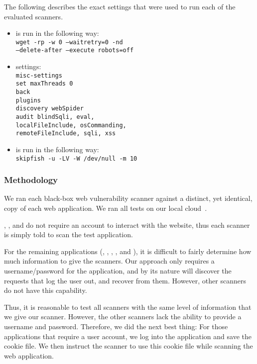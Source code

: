 The following describes the exact settings that were used to run each of the
evaluated scanners.

\begin{itemize}
\item \wget{} is run in the following way: \\
\texttt{wget -rp -w 0 --waitretry=0 -nd \\
\phantom{MM}--delete-after  --execute robots=off}

\item \waf{} settings: \\
\texttt{misc-settings  \\
set maxThreads 0 \\
back \\
plugins \\
discovery webSpider \\
audit blindSqli, eval, \\
\phantom{MM}localFileInclude, osCommanding, \\
\phantom{MM}remoteFileInclude, sqli, xss 
}

\item \skipfish{} is run in the following way: \\
\texttt{skipfish -u -LV -W /dev/null -m 10}
\end{itemize}

\subsubsection{Methodology}

We ran each black-box web vulnerability scanner against a distinct, yet
identical, copy of each web application. We ran all tests on our local
cloud~\cite{nurmi09:eucalyptus}.

\gallery{}, \wordpresstwo{}, and \wordpress{} do not require an account to
interact with the website, thus each scanner is simply told to scan the test
application. 

For the remaining applications (\phpbbtwo{}, \phpbbthree{}, \scarf{},
\vanillaforums{}, and \wackopicko{}), it is difficult to fairly determine how
much information to give the scanners. Our approach only requires a
username/password for the application, and by its nature will discover the
requests that log the user out, and recover from them. However, other scanners
do not have this capability.

Thus, it is reasonable to test all scanners with the same level of information
that we give our scanner. However, the other scanners lack the ability to
provide a username and password. Therefore, we did the next best thing: For
those applications that require a user account, we log into the application and
save the cookie file. We then instruct the scanner to use this cookie file
while scanning the web application.

